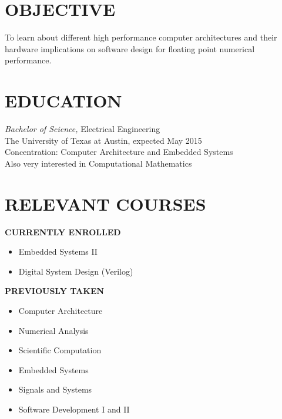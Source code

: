 \documentclass[margin]{res}
\begin{document}
\begin{resume}
  \section{OBJECTIVE} 
  To learn about different high performance computer architectures and
  their hardware implications on software design for floating point
  numerical performance.
  \section{EDUCATION} 
  {\sl Bachelor of Science,} Electrical Engineering \\
  The University of Texas at Austin,
  expected May 2015 \\
  Concentration: Computer Architecture and Embedded Systems\\
  Also very interested in Computational Mathematics
  \section{RELEVANT COURSES}
{\footnotesize\textbf{CURRENTLY ENROLLED}}
\vspace{-.75em}
\begin{multicols}{2}
  \begin{itemize}
  \item Embedded Systems II
  \item Digital System Design (Verilog)
  \end{itemize}
\end{multicols}
\vspace{-1.5em}
{\footnotesize\textbf{PREVIOUSLY TAKEN}}
\vspace{-.75em}
  \begin{multicols}{2}
    \begin{itemize}
    \item Computer Architecture
    \item Numerical Analysis
    \item Scientific Computation
    \item Embedded Systems
    \item Signals and Systems
    \item Software Development I and II
    \end{itemize}
  \end{multicols}


\end{resume}
\end{document}

